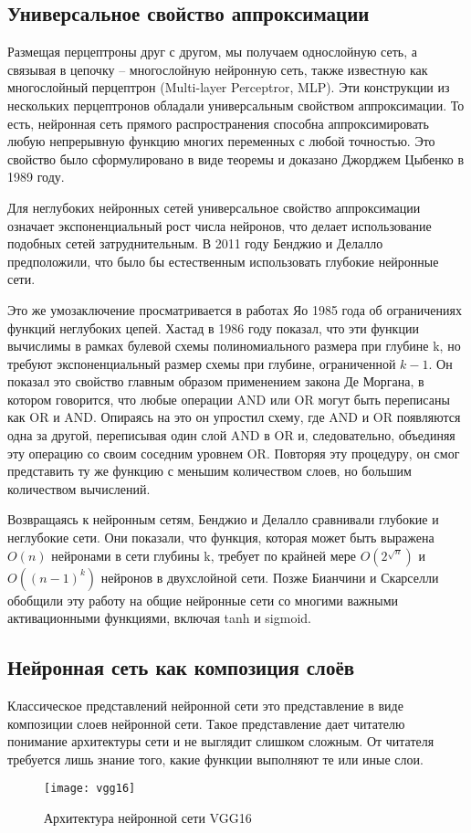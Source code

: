\subsection{Универсальное свойство аппроксимации}
Размещая перцептроны друг с другом, мы получаем однослойную сеть, а связывая в цепочку – многослойную нейронную сеть, также известную как многослойный перцептрон (Multi-layer Perceptror, MLP). Эти конструкции из нескольких перцептронов обладали универсальным свойством аппроксимации. То есть, нейронная сеть прямого распространения способна аппроксимировать любую непрерывную функцию многих переменных с любой точностью. Это свойство было сформулировано в виде теоремы и доказано  Джорджем Цыбенко в 1989 году\cite{cyb}.
\par
Для неглубоких нейронных сетей универсальное свойство аппроксимации означает экспоненциальный рост числа нейронов, что делает использование подобных сетей затруднительным. В 2011 году Бенджио и Делалло  предположили, что было бы естественным использовать глубокие нейронные сети.
\par
Это же умозаключение просматривается в работах Яо 1985\cite{yao} года об ограничениях функций неглубоких цепей. Хастад в 1986\cite{hastad} году показал, что эти функции вычислимы в рамках булевой схемы полиномиального размера      при глубине k, но требуют экспоненциальный размер схемы при глубине, ограниченной $k-1$. Он показал это свойство главным образом применением закона Де Моргана, в котором говорится, что любые операции AND или OR могут быть переписаны как OR и AND. Опираясь на это он упростил схему, где AND и OR появляются одна за другой, переписывая один слой AND в OR и, следовательно, объединяя эту операцию со своим соседним уровнем OR. Повторяя эту процедуру, он смог представить ту же функцию с меньшим количеством слоев, но большим количеством вычислений.
\par
Возвращаясь к нейронным сетям, Бенджио и Делалло\cite{shaldp} сравнивали глубокие и неглубокие сети. Они показали, что функция, которая может быть выражена $O(n)$ нейронами в сети глубины k, требует по крайней мере $O(2^{\sqrt{n}})$ и $O((n-1)^k)$ нейронов в двухслойной сети. Позже Бианчини и Скарселли обобщили эту работу на общие нейронные сети со многими важными активационными функциями, включая tanh и sigmoid.
\subsection{Нейронная сеть как композиция слоёв}
Классическое представлений нейронной сети это представление в виде композиции слоев нейронной сети. Такое представление дает читателю понимание архитектуры сети и не выглядит слишком сложным. От читателя требуется лишь знание того, какие функции выполняют те или иные слои.
\begin{figure}[H]
	\centering
	\texttt{[image: vgg16]}
	\caption{Архитектура нейронной сети VGG16}
	\label{hist:vgg16arch}
\end{figure}
